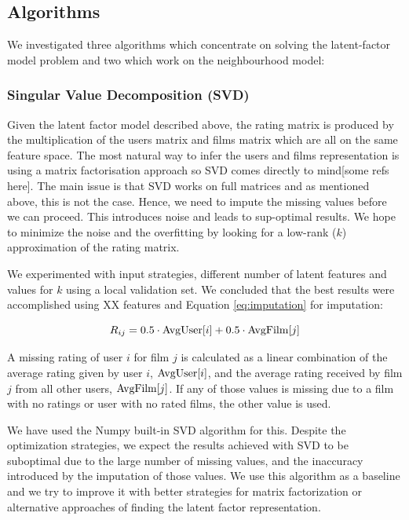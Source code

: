 \documentclass[10pt,conference,compsocconf]{IEEEtran}
\begin{document}
\subsection{Algorithms}
We investigated three algorithms which concentrate on solving the latent-factor model problem and two which work on the neighbourhood model:

\subsubsection*{\textbf{Singular Value Decomposition (SVD)}} Given the latent factor model described above, the rating matrix is produced by the multiplication of the users matrix and films matrix which are all on the same feature space. The most natural way to infer the users and films representation is using a matrix factorisation approach so SVD comes directly to mind[some refs here]. The main issue is that SVD works on full matrices and as mentioned above, this is not the case. Hence, we need to impute the missing values before we can proceed. This introduces noise and leads to sup-optimal results. We hope to minimize the noise and the overfitting by looking for a low-rank ($k$) approximation of the rating matrix. 

We experimented with input strategies, different number of latent features and values for $k$ using a local validation set. We concluded that the best results were accomplished using XX features and Equation \ref{eq:imputation} for imputation:

\begin{equation}
R_{ij}= 0.5\cdot \textnormal{AvgUser}[i] + 0.5\cdot \textnormal{AvgFilm}[j]
\label{eq:imputation}
\end{equation}

A missing rating of user $i$ for film $j$ is calculated as a linear combination of the average rating given by user $i$, $\textnormal{AvgUser}[i]$, and the average rating received by film $j$ from all other users, $\textnormal{AvgFilm}[j]$. If any of those values is missing due to a film with no ratings or user with no rated films, the other value is used.

We have used the Numpy built-in SVD algorithm for this. Despite the optimization strategies, we expect the results achieved with SVD to be suboptimal due to the large number of missing values, and the inaccuracy introduced by the imputation of those values. We use this algorithm as a baseline and we try to improve it with better strategies for matrix factorization or alternative approaches of finding the latent factor representation.
\end{document}
